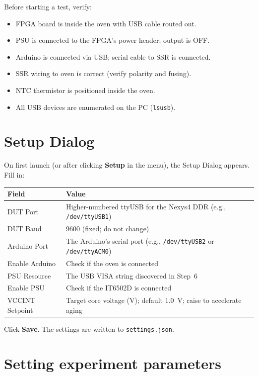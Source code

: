\documentclass[12pt, a4paper]{report}
\begin{document}
Before starting a test, verify:

\begin{itemize}
  \item[$\square$] FPGA board is inside the oven with USB cable routed out.
  \item[$\square$] PSU is connected to the FPGA's power header; output is OFF.
  \item[$\square$] Arduino is connected via USB; serial cable to SSR is connected.
  \item[$\square$] SSR wiring to oven is correct (verify polarity and fusing).
  \item[$\square$] NTC thermistor is positioned inside the oven.
  \item[$\square$] All USB devices are enumerated on the PC (\texttt{lsusb}).
\end{itemize}

\section{Setup Dialog}

On first launch (or after clicking \textbf{Setup} in the menu), the Setup Dialog
appears. Fill in:

\begin{longtable}{@{}ll@{}}
  \toprule
  \textbf{Field} & \textbf{Value} \\
  \midrule
  \endhead
  DUT Port & Higher-numbered ttyUSB for the Nexys4 DDR (e.g., \texttt{/dev/ttyUSB1}) \\
  DUT Baud & 9600 (fixed; do not change) \\
  Arduino Port & The Arduino's serial port (e.g., \texttt{/dev/ttyUSB2} or \texttt{/dev/ttyACM0}) \\
  Enable Arduino & Check if the oven is connected \\
  PSU Resource & The USB VISA string discovered in Step~6 \\
  Enable PSU & Check if the IT6502D is connected \\
  VCCINT Setpoint & Target core voltage (V); default 1.0~V; raise to accelerate aging \\
  \bottomrule
\end{longtable}

Click \textbf{Save}. The settings are written to \texttt{settings.json}.

\section{Setting experiment parameters}
\end{document}
